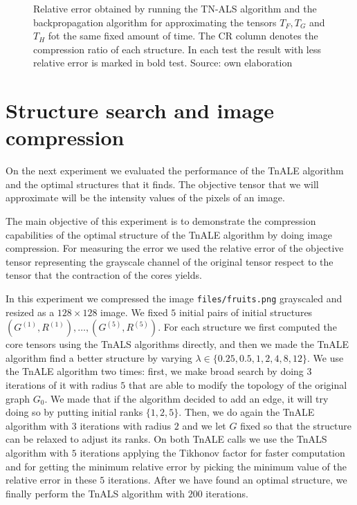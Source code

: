 \documentclass[11pt,a4paper,openright,oneside]{book}
\numberwithin{equation}{section}
\begin{document}
{\begin{figure}
\caption{Relative error obtained by running the TN-ALS algorithm and the backpropagation algorithm for approximating
    the tensors $T_F, T_G$ and $T_H$ fot the same fixed amount of time. The CR column denotes the compression ratio of each structure.
In each test the result with less relative error is marked in bold test. Source: own elaboration}
\label{fig:ap-table-backprop}
\end{figure}

\section{Structure search and image compression}

On the next experiment we evaluated the performance of the \gls{TnALE} algorithm and the optimal structures that it finds. The objective tensor
that we will approximate will be the intensity values of the pixels of an image.

The main objective of this experiment is to demonstrate the compression capabilities of the optimal structure of the \gls{TnALE} algorithm by
doing image compression. For measuring the error we used the relative error of the objective tensor representing the grayscale channel
of the original tensor respect to the tensor that the contraction of the cores yields.

In this experiment we compressed the image \verb|files/fruits.png| grayscaled and resized as a $128 \times 128$ image.
We fixed $5$ initial pairs of initial structures $(G^{(1)}, R^{(1)}), \dots, (G^{(5)}, R^{(5)})$.
For each structure we first computed the core tensors using the TnALS algorithms directly, and then
we made the \gls{TnALE} algorithm find a better structure by varying $\lambda \in \{0.25, 0.5, 1, 2, 4, 8, 12\}$. We use the
\gls{TnALE} algorithm two times: first, we make broad search by doing $3$ iterations of it with radius $5$ that are able to modify
the topology of the original graph $G_0$. We made that if the algorithm decided to add an edge, it will try doing so by putting initial
ranks $\{1, 2, 5\}$. Then, we do again the \gls{TnALE} algorithm with $3$ iterations with radius $2$ and we let $G$ fixed so that
the structure can be relaxed to adjust its ranks. On both \gls{TnALE} calls we use the
\gls{TnALS} algorithm with $5$ iterations applying the Tikhonov factor for faster computation and
for getting the minimum relative error by 
picking the minimum value of the relative error in these $5$ iterations.
After we have found an optimal structure, we finally perform the TnALS algorithm with $200$ iterations. 

}
\end{document}

